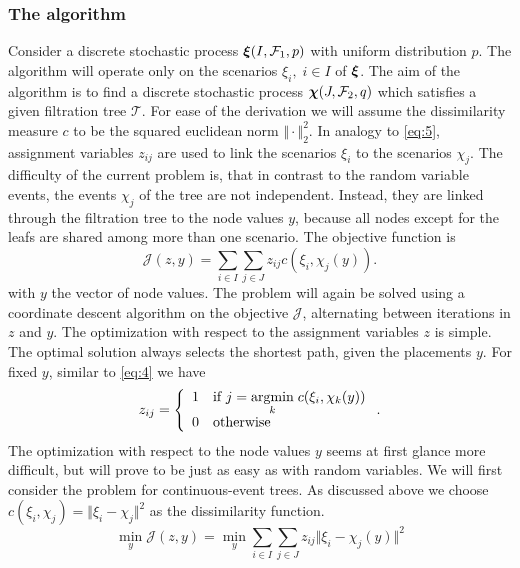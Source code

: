 \subsubsection{The algorithm}
\label{sec:k-means-for-trees-alg}
Consider a discrete stochastic process $\boldsymbol\xi(I, \mathcal{F}_1, p)$ with uniform distribution $p$.
The algorithm will operate only on the scenarios $\xi_i,\; i\in I$ of $\boldsymbol\xi$.
The aim of the algorithm is to find a discrete stochastic process $\boldsymbol\chi(J, \mathcal{F}_2,q)$ which satisfies a given filtration tree $\mathcal{T}$.
For ease of the derivation we will assume the dissimilarity measure $c$ to be the squared euclidean norm $\Vert\cdot\Vert_2^2$.
In analogy to \eqref{eq:5}, assignment variables $z_{ij}$ are used to link the scenarios $\xi_i$ to the scenarios $\chi_j$.
The difficulty of the current problem is, that in contrast to the random variable events, the events $\chi_j$ of the tree are not independent.
Instead, they are linked through the filtration tree to the node values $y$, because all nodes except for the leafs are shared among more than one scenario.
The objective function is
\begin{equation}
  \label{eq:8}
  \mathcal{J}(z, y) = \sum_{i\in I}\sum_{j\in J}z_{ij}c(\xi_i, \chi_j(y)).
\end{equation}
with $y$ the vector of  node values.
The problem will again be solved using a coordinate descent algorithm on the objective $\mathcal{J}$, alternating between iterations in $z$ and $y$.
The optimization with respect to the assignment variables $z$ is simple.
The optimal solution always selects the shortest path, given the placements $y$.
For fixed $y$, similar to \eqref{eq:4} we have
\begin{equation}
  \label{eq:10}
  z_{ij} = \left\{\begin{array}{ll}1&\text{if }j=\underset{k}{\operatorname{argmin}}\; c(\xi_i,\chi_k(y))\\0&\text{otherwise} \end{array}\right. .
\end{equation}
The optimization with respect to the node values $y$ seems at first glance more difficult, but will prove to be just as easy as with random variables.
We will first consider the problem for continuous-event trees.
As discussed above we choose $c(\xi_i, \chi_j) = \Vert \xi_i-\chi_j\Vert^2$ as the dissimilarity function.
\begin{equation}
  \label{eq:11}
  \min\limits_y \mathcal{J}(z,y) = \min\limits_y \sum_{i\in I}\sum_{j\in J}z_{ij}\Vert \xi_i - \chi_j(y)\Vert^2
\end{equation}
